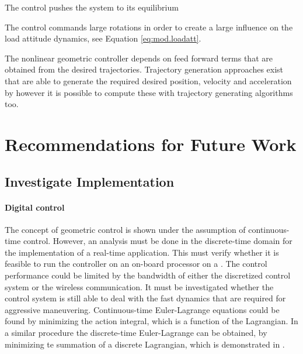 The  control pushes the system to its equilibrium 



The  control commands large  rotations in order to create a large influence on the load attitude dynamics, see Equation \ref{eq:mod.loadatt}. 

The nonlinear geometric controller depends on feed forward terms that are obtained from the desired trajectories. 
Trajectory generation approaches exist that are able to generate the required desired position, velocity and acceleration by 
however it is possible to compute these with trajectory generating algorithms too.


\section{Recommendations for Future Work}\label{ch:future}

\subsection{Investigate Implementation}

\paragraph{Digital control} The concept of geometric control is shown under the assumption of continuous-time control. 
However, an analysis must be done in the discrete-time domain for the implementation of a real-time application. This must verify whether it is feasible to run the controller on an on-board processor on a . The control performance could be limited by the bandwidth of either the discretized control system or the wireless communication.
It must be investigated whether the control system is still able to deal with the fast dynamics that are required for aggressive maneuvering. 
Continuous-time Euler-Lagrange equations could be found by minimizing the action integral, which is a function of the Lagrangian. In a similar procedure the discrete-time Euler-Lagrange can be obtained, by minimizing te summation of a discrete Lagrangian, which is demonstrated in \cite{Lee2008}. 

